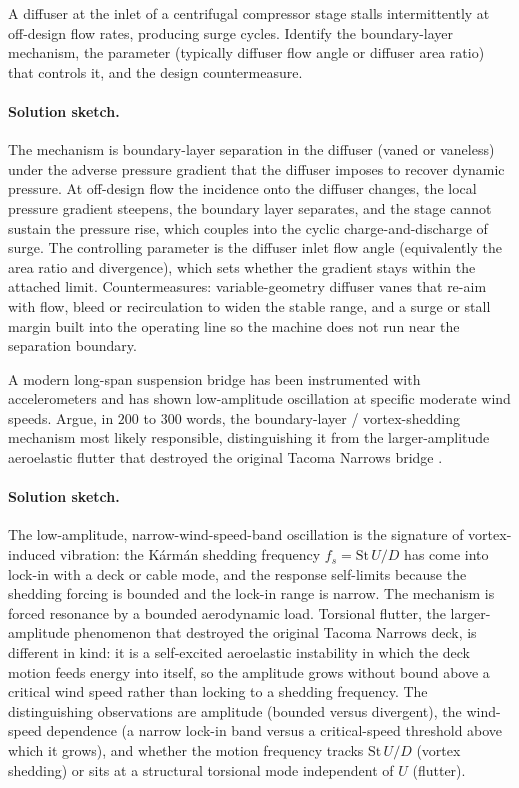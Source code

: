 \begin{exercise}
A diffuser at the inlet of a centrifugal compressor stage stalls
intermittently at off-design flow rates, producing surge cycles.
Identify the boundary-layer mechanism, the parameter (typically
diffuser flow angle or diffuser area ratio) that controls it, and
the design countermeasure.

\paragraph{Solution sketch.} The mechanism is boundary-layer
separation in the diffuser (vaned or vaneless) under the adverse
pressure gradient that the diffuser imposes to recover dynamic
pressure. At off-design flow the incidence onto the diffuser changes,
the local pressure gradient steepens, the boundary layer separates,
and the stage cannot sustain the pressure rise, which couples into the
cyclic charge-and-discharge of surge. The controlling parameter is the
diffuser inlet flow angle (equivalently the area ratio and divergence),
which sets whether the gradient stays within the attached limit.
Countermeasures: variable-geometry diffuser vanes that re-aim with
flow, bleed or recirculation to widen the stable range, and a surge
or stall margin built into the operating line so the machine does not
run near the separation boundary.
\end{exercise}

\begin{exercise}
A modern long-span suspension bridge has been instrumented with
accelerometers and has shown low-amplitude oscillation at
specific moderate wind speeds. Argue, in $200$ to $300$ words,
the boundary-layer / vortex-shedding mechanism most likely
responsible, distinguishing it from the larger-amplitude
aeroelastic flutter that destroyed the original Tacoma Narrows
bridge \cite{acc:tacoma-narrows-1941}.

\paragraph{Solution sketch.} The low-amplitude, narrow-wind-speed-band
oscillation is the signature of vortex-induced vibration: the Kármán
shedding frequency $f_s = \text{St}\,U/D$ has come into lock-in with a
deck or cable mode, and the response self-limits because the shedding
forcing is bounded and the lock-in range is narrow. The mechanism is
forced resonance by a bounded aerodynamic load. Torsional flutter, the
larger-amplitude phenomenon that destroyed the original Tacoma Narrows
deck, is different in kind: it is a self-excited aeroelastic
instability in which the deck motion feeds energy into itself, so the
amplitude grows without bound above a critical wind speed rather than
locking to a shedding frequency. The distinguishing observations are
amplitude (bounded versus divergent), the wind-speed dependence (a
narrow lock-in band versus a critical-speed threshold above which it
grows), and whether the motion frequency tracks $\text{St}\,U/D$
(vortex shedding) or sits at a structural torsional mode independent
of $U$ (flutter).
\end{exercise}

